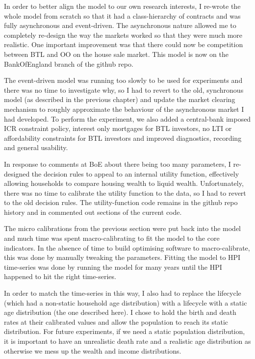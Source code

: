 \documentclass{report}
\begin{document}
In order to better align the model to our own research interests, I re-wrote the whole model from scratch so that it had a class-hierarchy of contracts and was fully asynchronous and event-driven. The asynchronous nature allowed me to completely re-design the way the markets worked so that they were much more realistic. One important improvement was that there could now be competition between BTL and OO on the house sale market. This model is now on the BankOfEngland branch of the github repo.

The event-driven model was running too slowly to be used for experiments and there was no time to investigate why, so I had to revert to the old, synchronous model (as described in the previous chapter) and update the market clearing mechanism to roughly approximate the behaviour of the asynchronous market I had developed. To perform the experiment, we also added a central-bank imposed ICR constraint policy, interest only mortgages for BTL investors, no LTI or affordability constraints for BTL investors and improved diagnostics, recording and general usability.

In response to comments at BoE about there being too many parameters, I re-designed the decision rules to appeal to an internal utility function, effectively allowing households to compare housing wealth to liquid wealth. Unfortunately, there was no time to calibrate the utility function to the data, so I had to revert to the old decision rules. The utility-function code remains in the github repo history and in commented out sections of the current code.

The micro calibrations from the previous section were put back into the model and much time was spent macro-calibrating to fit the model to the core indicators. In the absence of time to build optimising software to macro-calibrate, this was done by manually tweaking the parameters. Fitting the model to HPI time-series was done by running the model for many years until the HPI happened to hit the right time-series.

In order to match the time-series in this way, I also had to replace the lifecycle (which had a non-static household age distribution) with a lifecycle with a static age distribution (the one described here). I chose to hold the birth and death rates at their calibrated values and allow the population to reach its static distribution. For future experiments, if we need a static population distribution, it is important to have an unrealistic death rate and a realistic age distribution as otherwise we mess up the wealth and income distributions.
\end{document}
